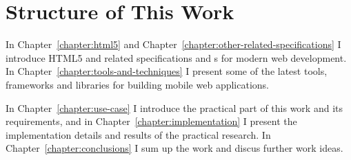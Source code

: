 \section{Structure of This Work}
\label{section:structure-of-this-work}

In Chapter~\ref{chapter:html5} and
Chapter~\ref{chapter:other-related-specifications} I introduce HTML5
and related specifications and s for modern web
development. In Chapter~\ref{chapter:tools-and-techniques} I present
some of the latest tools, frameworks and libraries for building mobile
web applications.

In Chapter~\ref{chapter:use-case} I introduce the practical part of
this work and its requirements, and in
Chapter~\ref{chapter:implementation} I present the implementation
details and results of the practical research. In
Chapter~\ref{chapter:conclusions} I sum up the work and discus further
work ideas.
